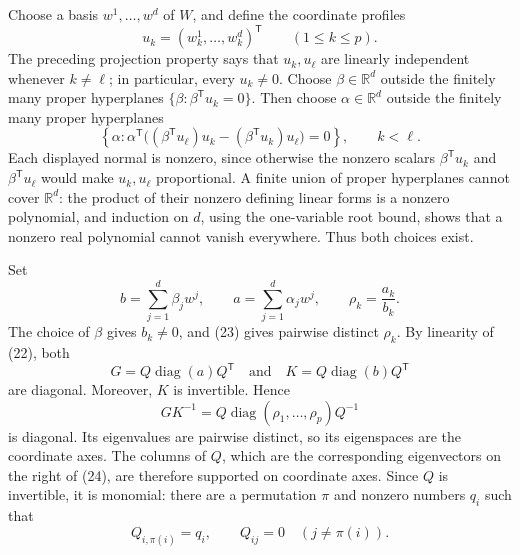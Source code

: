 Choose a basis \(w^1,\ldots,w^d\) of \(W\), and define the coordinate profiles
\[
u_k=(w^1_k,\ldots,w^d_k)^{\mathsf T}
\qquad(1\leq k\leq p).
\]
The preceding projection property says that \(u_k,u_\ell\) are linearly independent whenever \(k\ne\ell\); in particular, every \(u_k\ne0\). Choose \(\beta\in\mathbb R^d\) outside the finitely many proper hyperplanes \(\{\beta:\beta^{\mathsf T}u_k=0\}\). Then choose \(\alpha\in\mathbb R^d\) outside the finitely many proper hyperplanes
\[
\left\{\alpha:
\alpha^{\mathsf T}\bigl((\beta^{\mathsf T}u_\ell)u_k
-(\beta^{\mathsf T}u_k)u_\ell\bigr)=0\right\},
\qquad k<\ell.
\tag{23}
\]
Each displayed normal is nonzero, since otherwise the nonzero scalars \(\beta^{\mathsf T}u_k\) and \(\beta^{\mathsf T}u_\ell\) would make \(u_k,u_\ell\) proportional. A finite union of proper hyperplanes cannot cover \(\mathbb R^d\): the product of their nonzero defining linear forms is a nonzero polynomial, and induction on \(d\), using the one-variable root bound, shows that a nonzero real polynomial cannot vanish everywhere. Thus both choices exist.

Set
\[
b=\sum_{j=1}^d\beta_jw^j,
\qquad
a=\sum_{j=1}^d\alpha_jw^j,
\qquad
\rho_k=\frac{a_k}{b_k}.
\]
The choice of \(\beta\) gives \(b_k\ne0\), and (23) gives pairwise distinct \(\rho_k\). By linearity of (22), both
\[
G=Q\operatorname{diag}(a)Q^{\mathsf T}
\quad\text{and}\quad
K=Q\operatorname{diag}(b)Q^{\mathsf T}
\]
are diagonal. Moreover, \(K\) is invertible. Hence
\[
GK^{-1}
=Q\operatorname{diag}(\rho_1,\ldots,\rho_p)Q^{-1}
\tag{24}
\]
is diagonal. Its eigenvalues are pairwise distinct, so its eigenspaces are the coordinate axes. The columns of \(Q\), which are the corresponding eigenvectors on the right of (24), are therefore supported on coordinate axes. Since \(Q\) is invertible, it is monomial: there are a permutation \(\pi\) and nonzero numbers \(q_i\) such that
\[
Q_{i,\pi(i)}=q_i,
\qquad
Q_{ij}=0\quad(j\ne\pi(i)).
\tag{25}
\]


